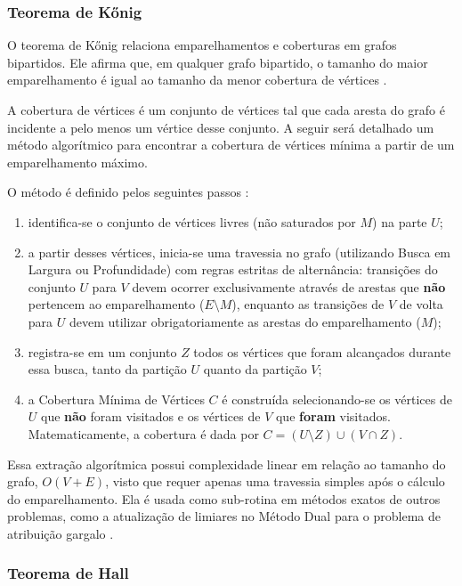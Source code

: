 \subsubsection{Teorema de Kőnig}
\label{p:teorema_konig}

O teorema de Kőnig relaciona emparelhamentos e coberturas em grafos bipartidos. Ele afirma que, em qualquer grafo bipartido, o tamanho do maior emparelhamento é igual ao tamanho da menor cobertura de vértices \cite{jungnickel}.

A cobertura de vértices é um conjunto de vértices tal que cada aresta do grafo é incidente a pelo menos um vértice desse conjunto. A seguir será detalhado um método algorítmico para encontrar a cobertura de vértices mínima a partir de um emparelhamento máximo.

O método é definido pelos seguintes passos \cite{jungnickel}:
\begin{enumerate}
    \item identifica-se o conjunto de vértices livres (não saturados por $M$) na parte $U$;
    \item a partir desses vértices, inicia-se uma travessia no grafo (utilizando Busca em Largura ou Profundidade) com regras estritas de alternância: transições do conjunto $U$ para $V$ devem ocorrer exclusivamente através de arestas que \textbf{não} pertencem ao emparelhamento ($E \setminus M$), enquanto as transições de $V$ de volta para $U$ devem utilizar obrigatoriamente as arestas do emparelhamento ($M$);
    \item registra-se em um conjunto $Z$ todos os vértices que foram alcançados durante essa busca, tanto da partição $U$ quanto da partição $V$;
    \item a Cobertura Mínima de Vértices $C$ é construída selecionando-se os vértices de $U$ que \textbf{não} foram visitados e os vértices de $V$ que \textbf{foram} visitados. Matematicamente, a cobertura é dada por $C = (U \setminus Z) \cup (V \cap Z)$.
\end{enumerate}

Essa extração algorítmica possui complexidade linear em relação ao tamanho do grafo, $O(V + E)$, visto que requer apenas uma travessia simples após o cálculo do emparelhamento. Ela é usada como sub-rotina em métodos exatos de outros problemas, como a atualização de limiares no Método Dual para o problema de atribuição gargalo \cite{cormen}.

\subsubsection{Teorema de Hall}

